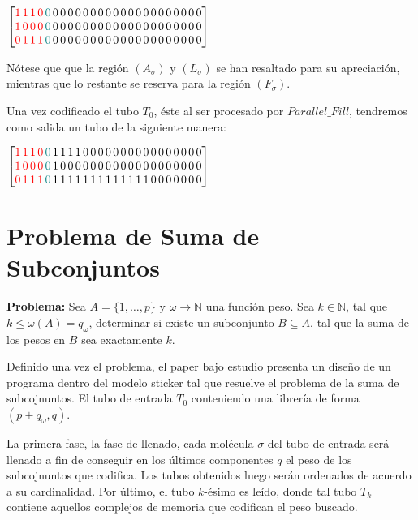 \documentclass[12pt, letterpaper, twoside]{article}
\begin{document}
        $
            \begin{bmatrix}
                \textcolor{red}{1\,1\,1\,0}\textcolor{teal}{\,0}\,0\,0\,0\,0\,0\,0\,0\,0\,0\,0\,0\,0\,0\,0\,0\,0\,0\,0\,0\,0\\
                \textcolor{red}{1\,0\,0\,0}\textcolor{teal}{\,0}\,0\,0\,0\,0\,0\,0\,0\,0\,0\,0\,0\,0\,0\,0\,0\,0\,0\,0\,0\,0 \\
                \textcolor{red}{0\,1\,1\,1}\textcolor{teal}{\,0}\,0\,0\,0\,0\,0\,0\,0\,0\,0\,0\,0\,0\,0\,0\,0\,0\,0\,0\,0\,0
            \end{bmatrix}
        $


Nótese que que la región $(A_\sigma)$ y $(L_\sigma)$ se han resaltado para su apreciación, mientras que lo restante se reserva para la región $(F_\sigma)$.


Una vez codificado el tubo $T_0$, éste al ser procesado por $Parallel\_Fill$, tendremos como salida un tubo de la siguiente manera:


    $
        \begin{bmatrix}
            \textcolor{red}{1\,1\,1\,0}\textcolor{teal}{\,0}\,1\,1\,1\,1\,0\,0\,0\,0\,0\,0\,0\,0\,0\,0\,0\,0\,0\,0\,0\,0\\
            \textcolor{red}{1\,0\,0\,0}\textcolor{teal}{\,0}\,1\,0\,0\,0\,0\,0\,0\,0\,0\,0\,0\,0\,0\,0\,0\,0\,0\,0\,0\,0 \\
            \textcolor{red}{0\,1\,1\,1}\textcolor{teal}{\,0}\,1\,1\,1\,1\,1\,1\,1\,1\,1\,1\,1\,1\,1\,0\,0\,0\,0\,0\,0\,0
        \end{bmatrix}
    $


    \newpage
    \section{Problema de Suma de Subconjuntos}
    \textbf{Problema:} Sea $A=\{1,\dots,p\}$ y $\omega\rightarrow\mathbb{N}$ una función peso. Sea $k\in\mathbb{N}$, tal que $k\leq\omega(A)=q_\omega$, determinar si existe un subconjunto $B\subseteq A$, tal que la suma de los pesos en $B$ sea exactamente $k$.


    Definido una vez el problema, el paper bajo estudio presenta un diseño de un programa dentro del modelo sticker tal que resuelve el problema de la suma de subcojnuntos. El tubo de entrada $T_0$ conteniendo una librería de forma $(p+q_\omega, q)$. 


    La primera fase, la fase de llenado, cada molécula $\sigma$ del tubo de entrada será llenado a fin de conseguir en los últimos componentes $q$ el peso de los subcojnuntos que codifica. Los tubos obtenidos luego serán ordenados de acuerdo a su cardinalidad. Por último, el tubo $k$-ésimo es leído, donde tal tubo $T_k$ contiene aquellos complejos de memoria que codifican el peso buscado.
\end{document}
